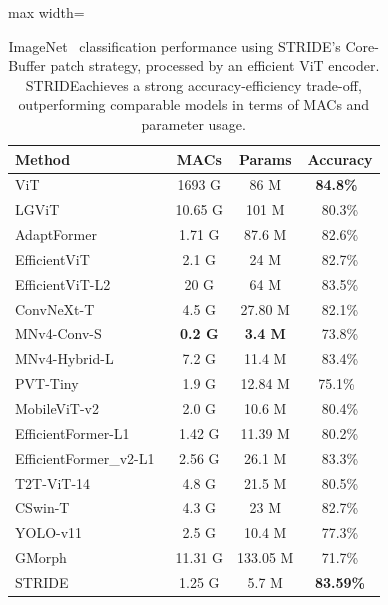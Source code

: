 \documentclass{article}
\newcommand{\name}{STRIDE}
\begin{document}
\begin{table}
\centering
\caption{ \small ImageNet~\cite{imagenet} classification performance using \name's Core-Buffer patch strategy, processed by an efficient ViT encoder.  \name achieves a strong accuracy-efficiency trade-off, outperforming comparable models in terms of MACs and parameter usage.}
\begin{adjustbox}{max width=\columnwidth}{
\begin{tabular}{lccc}
\toprule
\textbf{Method} & \textbf{MACs} & \textbf{Params} & \textbf{Accuracy}\\
\midrule
ViT~\cite{dosovitskiy2020image} & 1693 G & 86 M & \textbf{84.8\%}~\cite{steiner2021augreg}\\
\midrule
LGViT~\cite{xu2023lgvit} & 10.65 G & 101 M & 80.3\%\\
AdaptFormer~\cite{chen2022adaptformer} & 1.71 G & 87.6 M & 82.6\%\\
EfficientViT~\cite{cai2023efficientvit,efficientvit-b2-cls-huggingface} & 2.1 G & 24 M & 82.7\%\\
EfficientViT-L2~\cite{cai2023efficientvit,efficientvit-l2-cls-huggingface} & 20 G & 64 M & 83.5\%\\
ConvNeXt-T~\cite{liu2022convnet} & 4.5 G & 27.80 M & 82.1\%\\
MNv4-Conv-S~\cite{qin2404mobilenetv4} & \textbf{0.2 G} & \textbf{3.4 M} & 73.8\% \\
MNv4-Hybrid-L~\cite{qin2404mobilenetv4}  & 7.2 G & 11.4 M & 83.4\%\\
PVT-Tiny~\cite{wang2021pyramid}  & 1.9 G & 12.84 M & 75.1\%~\cite{huggingface_pvt_docs}\\
MobileViT-v2~\cite{mehta2023separable} &   2.0 G & 10.6 M & 80.4\%  \\
EfficientFormer-L1~\cite{li2022efficientformer} & 1.42 G & 11.39 M& 80.2\%\\
EfficientFormer\_v2-L1~\cite{efficientformerv2} & 2.56 G & 26.1 M& 83.3\%\\
T2T-ViT-14~\cite{yuan2021tokens} & 4.8 G & 21.5 M& 80.5\%\\
CSwin-T~\cite{dong2022cswin} & 4.3 G & 23 M& 82.7\%\\
YOLO-v11~\cite{yolo11} & 2.5 G & 10.4 M& 77.3\%\\
GMorph~\cite{yang2024gmorph} & 11.31 G & 133.05 M& 71.7\%\\
\name & 1.25 G & 5.7 M & \textbf{83.59\%}\\
\bottomrule
\end{tabular}
}
\end{adjustbox}
\vspace{-10pt}
\label{tab:imagenet_classification}
\end{table}
\end{document}
